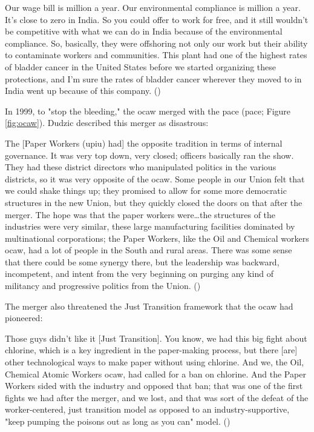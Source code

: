 \documentclass[12pt]{article}
\renewenvironment{quote}
  {\list{}{\leftmargin=\parindent\rightmargin=0pt}%
   \item\relax}
  {\endlist}
\begin{document}
\begin{quote}
Our wage bill is  million a year. Our environmental compliance is  million a year. It's close to zero in India. So you could offer to work for free, and it still wouldn't be competitive with what we can do in India because of the environmental compliance. So, basically, they were offshoring not only our work but their ability to contaminate workers and communities. This plant had one of the highest rates of bladder cancer in the United States before we started organizing these protections, and I'm sure the rates of bladder cancer wherever they moved to in India went up because of this company. (\citeyear{dudzicInterview2024})
\end{quote}

In 1999, to "stop the bleeding," the \acrshort{ocaw} merged with the \acrlong{pace} (\acrshort{pace}; Figure \ref{fig:ocaw}). Dudzic described this merger as disastrous:

\begin{quote}
The [Paper Workers (\acrshort{upiu}) had] the opposite tradition in terms of internal governance. It was very top down, very closed; officers basically ran the show. They had these district directors who manipulated politics in the various districts, so it was very opposite of the \acrshort{ocaw}. Some people in our Union felt that we could shake things up; they promised to allow for some more democratic structures in the new Union, but they quickly closed the doors on that after the merger. The hope was that the paper workers were\ldots{}the structures of the industries were very similar, these large manufacturing facilities dominated by multinational corporations; the Paper Workers, like the Oil and Chemical workers \acrshort{ocaw}, had a lot of people in the South and rural areas. There was some sense that there could be some synergy there, but the leadership was backward, incompetent, and intent from the very beginning on purging any kind of militancy and progressive politics from the Union. (\citeyear{dudzicInterview2024})
\end{quote}

\noindent The merger also threatened the Just Transition framework that the \acrshort{ocaw} had pioneered:

\begin{quote}
Those guys didn't like it [Just Transition]. You know, we had this big fight about chlorine, which is a key ingredient in the paper-making process, but there [are] other technological ways to make paper without using chlorine. And we, the Oil, Chemical Atomic Workers \acrshort{ocaw}, had called for a ban on chlorine. And the Paper Workers sided with the industry and opposed that ban; that was one of the first fights we had after the merger, and we lost, and that was sort of the defeat of the worker-centered, just transition model as opposed to an industry-supportive, "keep pumping the poisons out as long as you can" model. (\citeyear{dudzicInterview2024})
\end{quote}
\end{document}

